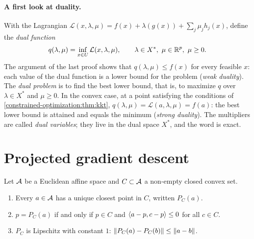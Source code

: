 \begin{notechapter}
\paragraph{A first look at duality.} With the Lagrangian
$\mathcal L(x, \lambda, \mu) = f(x) + \lambda(g(x)) + \sum_j\mu_jh_j(x)$,
define the \emph{dual function}
\[
  q(\lambda, \mu) = \inf_{x\in U}\mathcal L(x, \lambda, \mu) ,
  \qquad \lambda\in X^*,\ \mu\in\mathbb{R}^p,\ \mu\geq0 .
\]
The argument of the last proof shows that
$q(\lambda, \mu)\leq f(x)$ for every feasible $x$: each value of the dual
function is a lower bound for the problem (\emph{weak duality}). The
\emph{dual problem} is to find the best lower bound, that is, to maximize
$q$ over $\lambda\in X^*$ and $\mu\geq0$. In the convex case, at a point
satisfying the conditions of \cref{constrained-optimization:thm:kkt},
$q(\lambda, \mu) = \mathcal L(a, \lambda, \mu) = f(a)$: the best lower
bound is attained and equals the minimum (\emph{strong duality}). The
multipliers are called \emph{dual variables}; they live in the dual space
$X^*$, and the word is exact.

\section{Projected gradient descent}\label{constrained-optimization:sec:pgd}

Let $\mathcal{A}$ be a Euclidean affine space and $C\subset\mathcal{A}$ a non-empty
closed convex set.

\begin{proposition}
\label{constrained-optimization:prop:projection}
\begin{enumerate}[nosep]
  \item Every $a\in\mathcal{A}$ has a unique closest point in $C$, written
        $P_C(a)$.
  \item $p = P_C(a)$ if and only if $p\in C$ and
        $\left\langle a - p, c - p \right\rangle\leq0$ for all $c\in C$.
  \item $P_C$ is Lipschitz with constant $1$:
        $\left\|P_C(a) - P_C(b)\right\|\leq\left\|a - b\right\|$.
\end{enumerate}
\end{proposition}


\end{notechapter}
